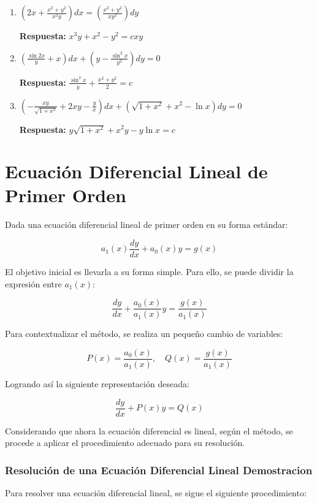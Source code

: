 \begin{enumerate}
    \item \( (2x + \frac{x^2 + y^2}{x^2 y})dx = \left(\frac{x^2 + y^2}{xy^2}\right) dy \)
    
    \textbf{Respuesta:} \( x^3 y + x^2 - y^2 = cxy \)

    \item \( \left(\frac{\sin 2x}{y} + x\right)dx + \left(y - \frac{\sin^2 x}{y^2}\right)dy = 0 \)
    
    \textbf{Respuesta:} \( \frac{\sin^2 x}{y} + \frac{x^2 + y^2}{2} = c \)

    \item \( \left(-\frac{xy}{\sqrt{1 + x^2}} + 2xy - \frac{y}{x}\right)dx + \left(\sqrt{1 + x^2} + x^2 - \ln x\right)dy = 0 \)
    
    \textbf{Respuesta:} \( y \sqrt{1 + x^2} + x^2 y - y \ln x = c \)
\end{enumerate}



\section{Ecuación Diferencial Lineal de Primer Orden}

Dada una ecuación diferencial lineal de primer orden en su forma estándar:

\[
a_{1}( x)\frac{dy}{dx} + a_{0}( x) y = g( x)
\]

El objetivo inicial es llevarla a su forma simple. Para ello, se puede dividir la expresión entre \( a_{1}( x) \):

\[
\frac{dy}{dx} + \frac{a_{0}( x)}{a_{1}( x)} y = \frac{g( x)}{a_{1}( x)}
\]

Para contextualizar el método, se realiza un pequeño cambio de variables:

\[
P( x) = \frac{a_{0}( x)}{a_{1}( x)}, \quad Q( x) = \frac{g( x)}{a_{1}( x)}
\]

Logrando así la siguiente representación deseada:

\[
\frac{dy}{dx} + P( x) y = Q( x)
\]

Considerando que ahora la ecuación diferencial es lineal, según el método, se procede a aplicar el procedimiento adecuado para su resolución.

\subsubsection{Resolución de una Ecuación Diferencial Lineal Demostracion}

Para resolver una ecuación diferencial lineal, se sigue el siguiente procedimiento:


